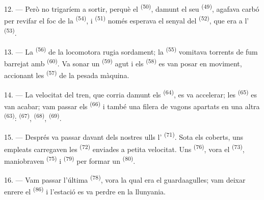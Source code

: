 12. --- Però no trigaríem a sortir, perquè el 
\textsuperscript{(50)}, damunt el seu  \textsuperscript{(49)},
agafava carbó per revifar el foc de la 
\textsuperscript{(54)}, i  \textsuperscript{(51)} només
esperava el senyal del  \textsuperscript{(52)}, que
era a l' \textsuperscript{(53)}.

13. --- La  \textsuperscript{(56)} de la locomotora rugia
sordament; la  \textsuperscript{(55)} vomitava torrents de fum
barrejat amb  \textsuperscript{(60)}. Va sonar un 
\textsuperscript{(59)} agut i els  \textsuperscript{(58)} es van
posar en moviment, accionant les  \textsuperscript{(57)} de la
pesada màquina.

\VUsaut{3.0mm}
\VUsaut{3.0mm}

14. --- La velocitat del tren, que corria damunt els 
\textsuperscript{(64)}, es va accelerar; les 
\textsuperscript{(65)} es van acabar; vam passar els 
\textsuperscript{(66)} i també una filera de vagons apartats en una altra
 \textsuperscript{(63)}:  \textsuperscript{(67)},
 \textsuperscript{(68)}, 
\textsuperscript{(69)}.


15. --- Després va passar davant dels nostres ulls l' \textsuperscript{(71)}. Sota els coberts, uns empleats carregaven les
 \textsuperscript{(72)} enviades a petita velocitat. Uns
 \textsuperscript{(76)}, vora el  \textsuperscript{(73)}, maniobraven 
\textsuperscript{(75)} i  \textsuperscript{(79)} per
formar un  \textsuperscript{(80)}.

16. --- Vam passar l'última  \textsuperscript{(78)}, vora la qual
era el guardaagulles; vam deixar enrere el 
\textsuperscript{(86)} i l'estació es va perdre en la llunyania.

